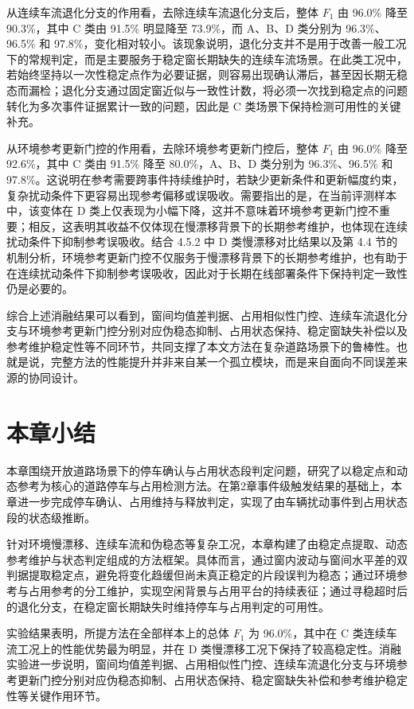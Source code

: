 \documentclass{xdupgthesis}
\begin{document}
从连续车流退化分支的作用看，去除连续车流退化分支后，整体 $F_1$ 由 96.0\% 降至 90.3\%，其中 C 类由 91.5\% 明显降至 73.9\%，而 A、B、D 类分别为 96.3\%、96.5\% 和 97.8\%，变化相对较小。该现象说明，退化分支并不是用于改善一般工况下的常规判定，而是主要服务于稳定窗长期缺失的连续车流场景。在此类工况中，若始终坚持以一次性稳定点作为必要证据，则容易出现确认滞后，甚至因长期无稳态而漏检；退化分支通过固定窗近似与一致性计数，将必须一次找到稳定点的问题转化为多次事件证据累计一致的问题，因此是 C 类场景下保持检测可用性的关键补充。

从环境参考更新门控的作用看，去除环境参考更新门控后，整体 $F_1$ 由 96.0\% 降至 92.6\%，其中 C 类由 91.5\% 降至 80.0\%，A、B、D 类分别为 96.3\%、96.5\% 和 97.8\%。这说明在参考需要跨事件持续维护时，若缺少更新条件和更新幅度约束，复杂扰动条件下更容易出现参考偏移或误吸收。需要指出的是，在当前评测样本中，该变体在 D 类上仅表现为小幅下降，这并不意味着环境参考更新门控不重要；相反，这表明其收益不仅体现在慢漂移背景下的长期参考维护，也体现在连续扰动条件下抑制参考误吸收。结合 4.5.2 中 D 类慢漂移对比结果以及第 4.4 节的机制分析，环境参考更新门控不仅服务于慢漂移背景下的长期参考维护，也有助于在连续扰动条件下抑制参考误吸收，因此对于长期在线部署条件下保持判定一致性仍是必要的。

综合上述消融结果可以看到，窗间均值差判据、占用相似性门控、连续车流退化分支与环境参考更新门控分别对应伪稳态抑制、占用状态保持、稳定窗缺失补偿以及参考维护稳定性等不同环节，共同支撑了本文方法在复杂道路场景下的鲁棒性。也就是说，完整方法的性能提升并非来自某一个孤立模块，而是来自面向不同误差来源的协同设计。

\section{本章小结}
\label{sec:ch4_summary}

本章围绕开放道路场景下的停车确认与占用状态段判定问题，研究了以稳定点和动态参考为核心的道路停车与占用检测方法。在第2章事件级触发结果的基础上，本章进一步完成停车确认、占用维持与释放判定，实现了由车辆扰动事件到占用状态段的状态级推断。

针对环境慢漂移、连续车流和伪稳态等复杂工况，本章构建了由稳定点提取、动态参考维护与状态判定组成的方法框架。具体而言，通过窗内波动与窗间水平差的双判据提取稳定点，避免将变化趋缓但尚未真正稳定的片段误判为稳态；通过环境参考与占用参考的分工维护，实现空闲背景与占用平台的持续表征；通过寻稳超时后的退化分支，在稳定窗长期缺失时维持停车与占用判定的可用性。

实验结果表明，所提方法在全部样本上的总体 $F_1$ 为 96.0\%，其中在 C 类连续车流工况上的性能优势最为明显，并在 D 类慢漂移工况下保持了较高稳定性。消融实验进一步说明，窗间均值差判据、占用相似性门控、连续车流退化分支与环境参考更新门控分别对应伪稳态抑制、占用状态保持、稳定窗缺失补偿和参考维护稳定性等关键作用环节。
\end{document}
